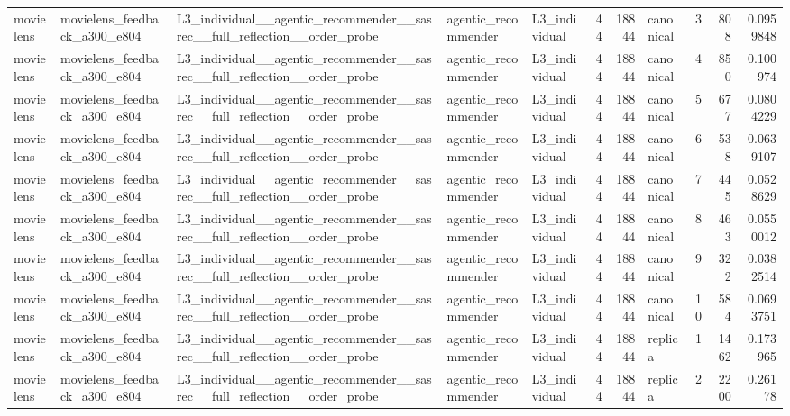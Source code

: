 \begin{table}[htbp!]
\begin{tabular}{lllllrrlrrr}
movielens & movielens\_feedback\_a300\_e804 & L3\_individual\_\_agentic\_recommender\_\_sasrec\_\_full\_reflection\_\_order\_probe & agentic\_recommender & L3\_individual & 44 & 18844 & canonical & 3 & 808 & 0.0959848 \\
movielens & movielens\_feedback\_a300\_e804 & L3\_individual\_\_agentic\_recommender\_\_sasrec\_\_full\_reflection\_\_order\_probe & agentic\_recommender & L3\_individual & 44 & 18844 & canonical & 4 & 850 & 0.100974 \\
movielens & movielens\_feedback\_a300\_e804 & L3\_individual\_\_agentic\_recommender\_\_sasrec\_\_full\_reflection\_\_order\_probe & agentic\_recommender & L3\_individual & 44 & 18844 & canonical & 5 & 677 & 0.0804229 \\
movielens & movielens\_feedback\_a300\_e804 & L3\_individual\_\_agentic\_recommender\_\_sasrec\_\_full\_reflection\_\_order\_probe & agentic\_recommender & L3\_individual & 44 & 18844 & canonical & 6 & 538 & 0.0639107 \\
movielens & movielens\_feedback\_a300\_e804 & L3\_individual\_\_agentic\_recommender\_\_sasrec\_\_full\_reflection\_\_order\_probe & agentic\_recommender & L3\_individual & 44 & 18844 & canonical & 7 & 445 & 0.0528629 \\
movielens & movielens\_feedback\_a300\_e804 & L3\_individual\_\_agentic\_recommender\_\_sasrec\_\_full\_reflection\_\_order\_probe & agentic\_recommender & L3\_individual & 44 & 18844 & canonical & 8 & 463 & 0.0550012 \\
movielens & movielens\_feedback\_a300\_e804 & L3\_individual\_\_agentic\_recommender\_\_sasrec\_\_full\_reflection\_\_order\_probe & agentic\_recommender & L3\_individual & 44 & 18844 & canonical & 9 & 322 & 0.0382514 \\
movielens & movielens\_feedback\_a300\_e804 & L3\_individual\_\_agentic\_recommender\_\_sasrec\_\_full\_reflection\_\_order\_probe & agentic\_recommender & L3\_individual & 44 & 18844 & canonical & 10 & 584 & 0.0693751 \\
movielens & movielens\_feedback\_a300\_e804 & L3\_individual\_\_agentic\_recommender\_\_sasrec\_\_full\_reflection\_\_order\_probe & agentic\_recommender & L3\_individual & 44 & 18844 & replica & 1 & 1462 & 0.173965 \\
movielens & movielens\_feedback\_a300\_e804 & L3\_individual\_\_agentic\_recommender\_\_sasrec\_\_full\_reflection\_\_order\_probe & agentic\_recommender & L3\_individual & 44 & 18844 & replica & 2 & 2200 & 0.26178 \\

\end{tabular}
\end{table}
